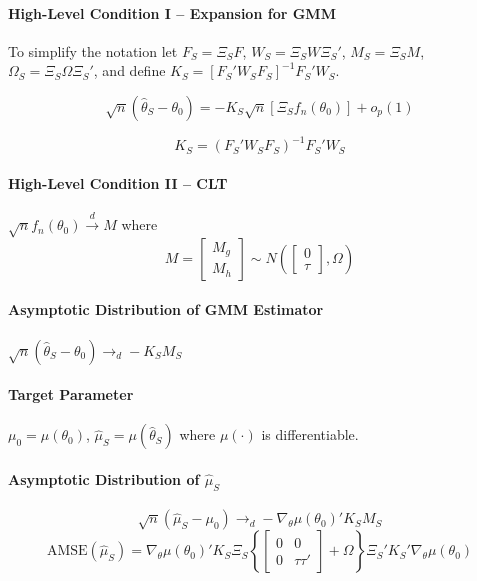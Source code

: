 \documentclass[12pt]{article}
\theoremstyle{definition}
\begin{document}
\paragraph{High-Level Condition I -- Expansion for GMM}
To simplify the notation let $F_S = \Xi_S F$, $W_S = \Xi_S W\Xi_S'$, $M_S = \Xi_S M$, $\Omega_S = \Xi_S \Omega\Xi_S'$, and define $K_S  = [F_S'W_SF_S]^{-1} F_S'W_S$.


$$\sqrt{n}\left(\widehat{\theta}_S - \theta_0\right) = -K_S\sqrt{n}\left[\Xi_S f_n(\theta_0)\right] + o_p(1)$$


$$K_S = \left(F_S' W_S F_S  \right)^{-1}F_S'W_S$$

\paragraph{High-Level Condition II -- CLT} $\sqrt{n}f_n(\theta_0) \overset{d}{\rightarrow}M$ where
	$$M = \left[\begin{array}{c} M_g \\ M_h\end{array} \right] \sim N\left( \left[\begin{array}{c}0\\ \tau \end{array} \right], \Omega \right)$$

\paragraph{Asymptotic Distribution of GMM Estimator} $\sqrt{n}(\widehat{\theta}_S - \theta_0 ) \rightarrow_d-K_S  M_S$

\paragraph{Target Parameter} $\mu_0 = \mu(\theta_0)$, $\widehat{\mu}_S = \mu(\widehat{\theta}_S)$ where $\mu(\cdot)$ is differentiable.

\paragraph{Asymptotic Distribution of $\widehat{\mu}_S$} 
$$\sqrt{n}\left(\widehat{\mu}_S - \mu_0\right)\rightarrow_d-\nabla_\theta\mu(\theta_0)'K_S M_S$$
$$\mbox{AMSE}\left(\widehat{\mu}_S\right) = \nabla_\theta\mu(\theta_0)'K_S \Xi_S \left\{\left[\begin{array}{cc}0&0\\0&\tau\tau'\end{array}\right] + \Omega\right\}\Xi_S'K_S'\nabla_\theta\mu(\theta_0)$$
\end{document}
